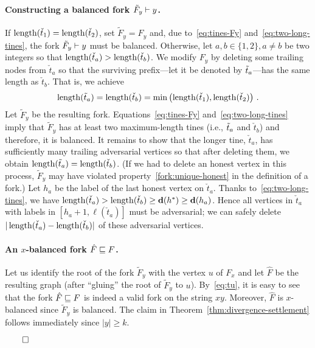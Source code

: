    \paragraph{Constructing a balanced fork $\tilde{F}_y \vdash y$.}    
    If $\operatorname{length}(\check{t}_1) = \operatorname{length}(\check{t}_2)$, set $\tilde{F}_y = F_y$ 
    and, due to~\eqref{eq:tines-Fy} and~\eqref{eq:two-long-tines}, 
    the fork $\tilde{F}_y \vdash y$ must be balanced. 
    Otherwise, 
    let $a, b \in \{1, 2\}, a \neq b$ be two integers so that 
    $\operatorname{length}(\check{t}_a) > \operatorname{length}(\check{t}_b)$. 
    We modify $F_y$ by deleting some trailing nodes from $\check{t}_a$ 
    so that the surviving prefix---let it be denoted by $\tilde{t}_a$---has the same length as $\check{t}_b$. 
    That is, we achieve 
    \[
      \operatorname{length}(\tilde{t}_a) = \operatorname{length}(\check{t}_b) = \min\left(\operatorname{length}(\check{t}_1), \operatorname{length}(\check{t}_2) \right)
      \,. 
    \]
    Let $\tilde{F}_y$ be the resulting fork. 
    Equations~\eqref{eq:tines-Fy} and~\eqref{eq:two-long-tines} imply that 
    $\tilde{F}_y$ has at least two maximum-length tines (i.e., $\tilde{t}_a$ and $\check{t}_b$) 
    and therefore, it is balanced.
    It remains to show that the longer tine, $\check{t}_a$, 
    has sufficiently many trailing adversarial vertices so that after deleting them, 
    we obtain 
    $\operatorname{length}(\tilde{t}_a) = \operatorname{length}(\check{t}_b)$. 
    (If we had to delete an honest vertex in this process, 
    $\tilde{F}_y$ may have violated 
    property~\ref{fork:unique-honest} in the definition of a fork.)    
    Let $h_a$ be the label of the last honest vertex 
    on $\check{t}_a$. 
    Thanks to~\eqref{eq:two-long-tines}, 
    we have 
    $\operatorname{length}(\check{t}_a) > \operatorname{length}(\check{t}_b) \geq \mathbf{d}(h^*) \geq \mathbf{d}(h_a)$. 
    Hence all vertices in $\check{t}_a$ 
    with labels in $[h_a + 1, \ell(\check{t}_a)]$ 
    must be adversarial; 
    we can safely delete $|\operatorname{length}(\check{t}_a) - \operatorname{length}(\check{t}_b)|$ 
    of these adversarial vertices.

    
    \paragraph{An $x$-balanced fork $\hat{F} \sqsubseteq F$.} 
    Let us identify the root of the fork $\tilde{F}_y$ with the vertex $u$ of $F_x$ and 
    let $\hat{F}$ be the resulting graph (after ``gluing'' the root of $\tilde{F}_y$ to $u$). 
    By~\eqref{eq:tu}, it is easy to see that the fork 
    $\hat{F} \sqsubseteq F$ 
    is indeed a valid fork on the string $x y$. 
    Moreover, $\hat{F}$ is $x$-balanced since $\tilde{F}_y$ is balanced. 
    The claim in Theorem~\ref{thm:divergence-settlement} follows immediately since $|y| \geq k$.
  
    \hfill$\qed$


